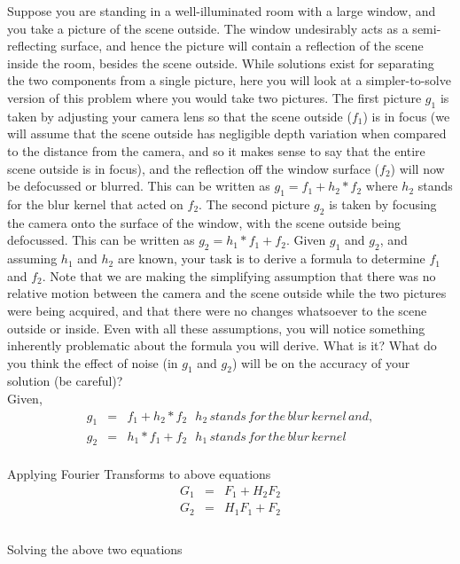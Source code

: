 \documentclass[11pt]{article}
\begin{document}
\maketitle
Suppose you are standing in a well-illuminated room with a large window, and you take a picture of the scene outside. The window undesirably acts as a semi-reflecting surface, and hence the picture will contain a reflection of the scene inside the room, besides the scene outside. While solutions exist for separating the two components from a single picture, here you will look at a simpler-to-solve version of this problem where you would take two pictures. The first picture $g_1$ is taken by adjusting your camera lens so that the scene outside ($f_1$) is in focus (we will assume that the scene outside has negligible depth variation when compared to the distance from the camera, and so it makes sense to say that the entire scene outside is in focus), and the reflection off the window surface ($f_2$) will now be defocussed or blurred.  This can be written as $g_1 = f_1 + h_2 * f_2$ where $h_2$ stands for the blur kernel that acted on $f_2$. The second picture $g_2$ is taken by focusing the camera onto the surface of the window, with the scene outside being defocussed. This can be written as $g_2 = h_1 * f_1 + f_2$. Given $g_1$ and $g_2$, and assuming $h_1$ and $h_2$ are known, your task is to derive a formula to determine $f_1$ and $f_2$. Note that we are making the simplifying assumption that there was no relative motion between the camera and the scene outside while the two pictures were being acquired, and that there were no changes whatsoever to the scene outside or inside. Even with all these assumptions, you will notice something inherently problematic about the formula you will derive. What is it? What do you think the effect of noise (in $g_1$ and $g_2$) will be on the accuracy of your solution (be careful)? \\

Given,\\
\begin{eqnarray*}
g_1 &=& f_1 + h_2 * f_2\:\:\: h_2\, stands\, for\, the\, blur\, kernel\, and,\\
g_2 &=& h_1 * f_1 + f_2\:\:\: h_1\, stands\, for\, the\, blur\, kernel\, \\
\end{eqnarray*}

Applying Fourier Transforms to above equations\\
\begin{eqnarray*}
G_1 &=& F_1 + H_2 F_2 \\
G_2 &=& H_1 F_1 + F_2 \\
\end{eqnarray*}
\\
Solving the above two equations 
\end{document}
